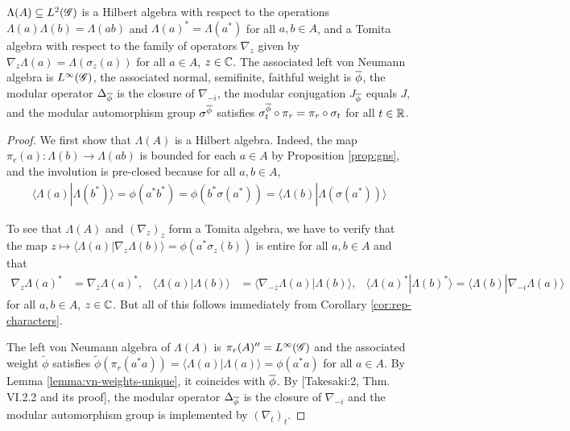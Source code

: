 \begin{Lem} \label{lemma:vn-hilbert}
  $\Lambda(A) \subseteq L^{2}(\mathscr{G})$ is a Hilbert algebra with respect to
  the operations $\Lambda(a)\Lambda(b)=\Lambda(ab)$ and
  $\Lambda(a)^{*}= \Lambda(a^{*})$ for all $a,b\in A$, and a Tomita
  algebra with respect to the family of operators $\nabla_{z}$ given
  by $\nabla_{z}\Lambda(a)=\Lambda(\sigma_{z}(a))$ for all $a\in A$,
  $z\in \mathbb{C}$.  The associated left von Neumann
  algebra is $L^{\infty}(\mathscr{G})$, the associated normal, semifinite, faithful
  weight is $\overline{\phi}$, the modular operator  $\Delta_{\overline{\phi}}$ is the
  closure of $\nabla_{-i}$,  the modular conjugation $J_{\overline{\phi}}$
  equals $J$, and the modular automorphism group $\sigma^{\overline{\phi}}$
  satisfies $\sigma^{\overline{\phi}}_{t} \circ \pi_{r} = \pi_{r} \circ
  \sigma_{t}$ for all $t\in \mathbb{R}$.
\end{Lem}
\begin{proof}
  We first show that $\Lambda(A)$ is a Hilbert algebra. Indeed, the
  map $\pi_{r}(a)\colon \Lambda(b) \to \Lambda(ab)$ is bounded for
  each $a \in A$ by Proposition \ref{prop:gns}, and the involution is
  pre-closed because  for all $a,b \in A$,
  \begin{align*}
    \langle \Lambda(a)|\Lambda(b^{*})\rangle = \phi(a^{*}b^{*}) =
    \phi(b^{*}\sigma(a^{*})) = \langle
    \Lambda(b)|\Lambda(\sigma(a^{*}))\rangle
  \end{align*}

To see that $\Lambda(A)$ and $(\nabla_{z})_{z}$ form a Tomita
  algebra, we have to verify that the map
  $z\mapsto
  \langle \Lambda(a)|\nabla_{z}\Lambda(b)\rangle =
  \phi(a^{*}\sigma_{z}(b))$ is entire for all $a,b\in A$ and that
  \begin{align*}
    \nabla_{z}\Lambda(a)^{*} &= \nabla_{\overline{z}}\Lambda(a)^{*}, &
    \langle \Lambda(a)|\Lambda(b)\rangle &= \langle
    \nabla_{-\overline{z}}\Lambda(a) |\Lambda(b)\rangle, & \langle
    \Lambda(a)^{*}|\Lambda(b)^{*}\rangle = \langle \Lambda(b)|\nabla_{-i}\Lambda(a)\rangle
  \end{align*}
  for all $a,b\in A$, $z\in \mathbb{C}$. But all of this follows immediately
  from Corollary \ref{cor:rep-characters}.


  The left von Neumann algebra of $\Lambda(A)$ is
  $\pi_{r}(A)''=L^{\infty}(\mathscr{G})$ and the associated weight $\tilde\phi$
  satisfies $\tilde
  \phi(\pi_{r}(a^{*}a))=\langle\Lambda(a)|\Lambda(a)\rangle =
  \phi(a^{*}a)$ for all $a\in A$. By Lemma
  \ref{lemma:vn-weights-unique}, it coincides with $\overline{\phi}$.  By
  \cite{} [Takesaki:2, Thm. VI.2.2 and its proof], the modular
  operator $\Delta_{\overline{\phi}}$ is the closure of $\nabla_{-i}$ and the
  modular automorphism group is implemented by $(\nabla_{t})_{t}$. 
\end{proof}

